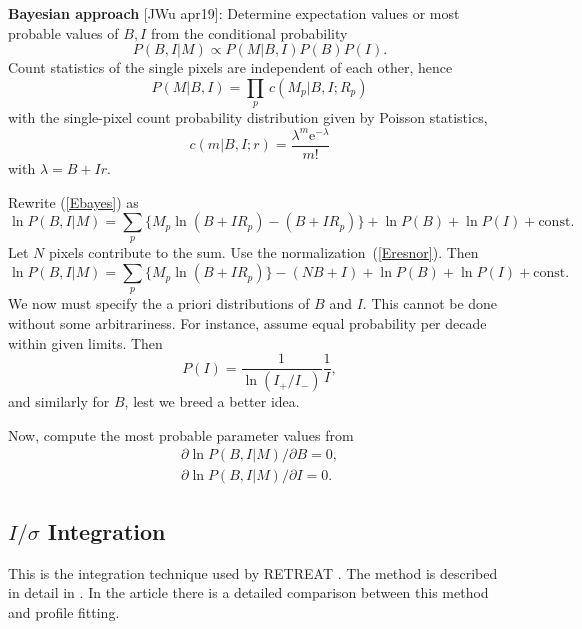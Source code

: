 \documentclass[11pt,a4paper]{article}
\begin{document}
\textbf{Bayesian approach} [JWu apr19]:
Determine expectation values or most probable values of $B,I$ from the conditional probability
\begin{equation}\label{Ebayes}
  P(B,I|M) \propto P(M|B,I) P(B) P(I).
\end{equation}
Count statistics of the single pixels are independent of each other, hence
\begin{equation}\label{Ec2p}
  P(M|B,I) = \prod_p\, c(M_p|B,I;R_p)
\end{equation}
with the single-pixel count probability distribution given by Poisson statistics,
\begin{equation}
  c(m|B,I;r) = \frac{\lambda^m{\mathrm e}^{-\lambda}}{m!}
\end{equation}
with $\lambda=B+Ir$.

Rewrite (\ref{Ebayes}) as
\begin{equation}
  \ln P(B,I|M) = \sum_p\Big\{M_p\ln(B+IR_p)-(B+IR_p)\Big\} +\ln P(B) + \ln P(I) + \mathrm{const}.
\end{equation}
Let $N$ pixels contribute to the sum.
Use the normalization~(\ref{Eresnor}).
Then
\begin{equation}
  \ln P(B,I|M) = \sum_p\Big\{M_p\ln(B+IR_p)\Big\}-(NB+I) +\ln P(B) + \ln P(I) + \mathrm{const}.
\end{equation}
We now must specify the a priori distributions of $B$ and $I$.
This cannot be done without some arbitrariness.
For instance, assume equal probability per decade within given limits.
Then
\begin{equation}
  P(I) = \frac{1}{\ln(I_{+}/I_{-})} \frac{1}{I},
\end{equation}
and similarly for $B$, lest we breed a better idea.

Now, compute the most probable parameter values from
\begin{equation}
  \begin{array}{l}
  \partial \ln P(B,I|M) / \partial B = 0, \\[1.2ex]
  \partial \ln P(B,I|M) / \partial I = 0.
  \end{array}
\end{equation}


\subsection{\boldmath$I/\sigma$ Integration}

This is the integration technique used by RETREAT \cite{StMc13}. The method is described in detail in \cite{WiKS88}.
In the article \cite{PrWM97} there is a detailed comparison between this method and profile fitting.
\end{document}

